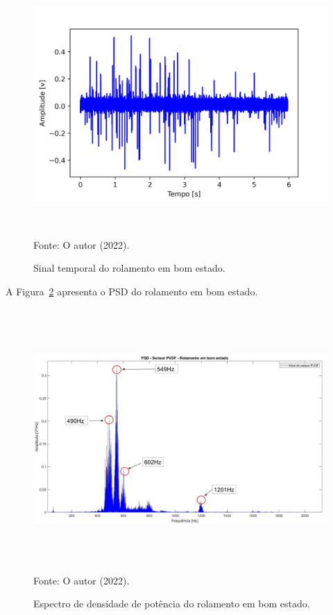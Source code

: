 \documentclass[
	12pt,				
	oneside,			
	a4paper,			
	english,			
	brazil,			
	]{abntex2ppgsi}
\begin{document}
{{{{{{{{{{{\begin{figure}[H]
\centering
\caption {Sinal temporal do rolamento em bom estado.}
\includegraphics[width=\textwidth,height=100mm,keepaspectratio]{aquisicao_05_rolamento_bom_10_03_2022_09h03min_ajustado_6s} \\
Fonte: O autor (2022).
\label{DOMINIO_TEMPO_ROLAMENTO_BOM}
\end{figure} 

A Figura~\ref{PSD_ROLAMENTO_BOM} apresenta o PSD do rolamento em bom estado.

\begin{figure}[H]
\centering
\caption {Espectro de densidade de potência do rolamento em bom estado.}
\includegraphics[width=\textwidth,height=100mm,keepaspectratio]{PSD_PVDF_ROLAMENTO_BOM} \\
Fonte: O autor (2022).
\label{PSD_ROLAMENTO_BOM}
\end{figure} 

}}}}}}}}}}}
\end{document}
